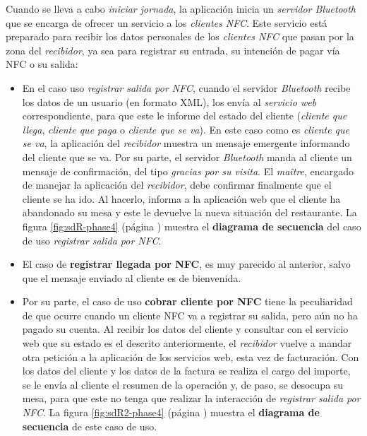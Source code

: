 Cuando se lleva a cabo \emph{iniciar jornada}, la aplicación inicia un
\emph{servidor Bluetooth} que se encarga de ofrecer un servicio a los
\emph{clientes \acs{NFC}}. Este servicio está preparado para recibir
los datos personales de los \emph{clientes \acs{NFC}} que pasan por la
zona del \emph{recibidor}, ya sea para registrar su entrada, su intención de
pagar vía \acs{NFC} o su salida:
\begin{itemize}
\item En el caso uso \emph{registrar salida por \acs{NFC}}, cuando el 
servidor \emph{Bluetooth} recibe los datos de un usuario (en formato
\acs{XML}), los envía al \emph{servicio web} correspondiente, para que este le 
informe del estado del cliente (\emph{cliente que llega}, \emph{cliente que 
paga} o \emph{cliente que se va}). En este caso como es \emph{cliente que se 
va}, la aplicación del \emph{recibidor} muestra un mensaje emergente informando 
del cliente que se va. Por su parte, el servidor \emph{Bluetooth} manda al 
cliente un mensaje de confirmación, del tipo \emph{gracias por su visita}. El 
\emph{maître}, encargado de manejar la aplicación del \emph{recibidor}, debe 
confirmar finalmente que el cliente se ha ido. Al hacerlo, informa a la 
aplicación web que el cliente ha abandonado su mesa y este le devuelve la nueva 
situación del restaurante. La figura \ref{fig:sdR-phase4} (página
\pageref{fig:sdR-phase4}) muestra el \textbf{diagrama de secuencia} del caso de 
uso \emph{registrar salida por \acs{NFC}}.

\item El caso de \textbf{registrar llegada por \acs{NFC}}, es muy parecido al
anterior, salvo que el mensaje enviado al cliente es de bienvenida.
\item Por su parte, el caso de uso \textbf{cobrar cliente por \acs{NFC}} tiene
la peculiaridad de que ocurre cuando un cliente \acs{NFC} va a registrar su
salida, pero aún no ha pagado su cuenta. Al recibir los datos del cliente y
consultar con el servicio web que su estado es el descrito anteriormente, el
\emph{recibidor} vuelve a mandar otra petición a la aplicación de los servicios
web, esta vez de facturación. Con los datos del cliente y los datos de la
factura se realiza el cargo del importe, se le envía al cliente el resumen de
la operación y, de paso, se desocupa su mesa, para que este no tenga que
realizar la interacción de \emph{registrar salida por \acs{NFC}}. La figura
\ref{fig:sdR2-phase4} (página \pageref{sdR2-phase4}) muestra el
\textbf{diagrama de secuencia} de este caso de uso.
\end{itemize}

